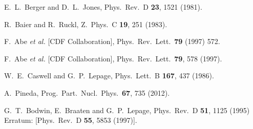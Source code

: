 \documentclass[twocolumn,aps,superscriptaddress,showpacs,nofootinbib,floatfix]{revtex4}
\begin{document}
\begin{thebibliography}{99}
  E.~L.~Berger and D.~L.~Jones,
  Phys.\ Rev.\ D {\bf 23}, 1521 (1981).

  R.~Baier and R.~Ruckl,
  Z.\ Phys.\ C {\bf 19}, 251 (1983).

  F.~Abe {\it et al.} [CDF Collaboration],
  Phys.\ Rev.\ Lett.\  {\bf 79} (1997) 572.

  F.~Abe {\it et al.} [CDF Collaboration],
  Phys.\ Rev.\ Lett.\  {\bf 79}, 578 (1997).

  W.~E.~Caswell and G.~P.~Lepage,
  Phys.\ Lett.\ B {\bf 167}, 437 (1986).

  A.~Pineda,
  Prog.\ Part.\ Nucl.\ Phys.\  {\bf 67}, 735 (2012).

  G.~T.~Bodwin, E.~Braaten and G.~P.~Lepage,
  Phys.\ Rev.\ D {\bf 51}, 1125 (1995)
  Erratum: [Phys.\ Rev.\ D {\bf 55}, 5853 (1997)].


\end{thebibliography}
\end{document}
